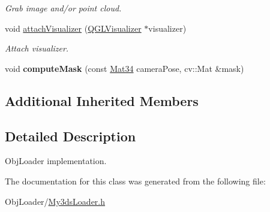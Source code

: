 \begin{DoxyCompactItemize}
\begin{DoxyCompactList}\small\item\em Grab image and/or point cloud. \end{DoxyCompactList}\item 
void \hyperlink{classMy3dsLoader_a38212071c23780b420da74ed5220192e}{attach\+Visualizer} (\hyperlink{classQGLVisualizer}{Q\+G\+L\+Visualizer} $\ast$visualizer)\hypertarget{classMy3dsLoader_a38212071c23780b420da74ed5220192e}{}\label{classMy3dsLoader_a38212071c23780b420da74ed5220192e}

\begin{DoxyCompactList}\small\item\em Attach visualizer. \end{DoxyCompactList}\item 
void {\bfseries compute\+Mask} (const \hyperlink{namespaceputar_a8bf3c8025ae8f60f553a752014c9849a}{Mat34} camera\+Pose, cv\+::\+Mat \&mask)\hypertarget{classMy3dsLoader_a7df0bbbf73e73a1ee59c3e0316111bbc}{}\label{classMy3dsLoader_a7df0bbbf73e73a1ee59c3e0316111bbc}

\end{DoxyCompactItemize}
\subsection*{Additional Inherited Members}


\subsection{Detailed Description}
Obj\+Loader implementation. 

The documentation for this class was generated from the following file\+:\begin{DoxyCompactItemize}
\item 
Obj\+Loader/\hyperlink{My3dsLoader_8h}{My3ds\+Loader.\+h}\end{DoxyCompactItemize}
